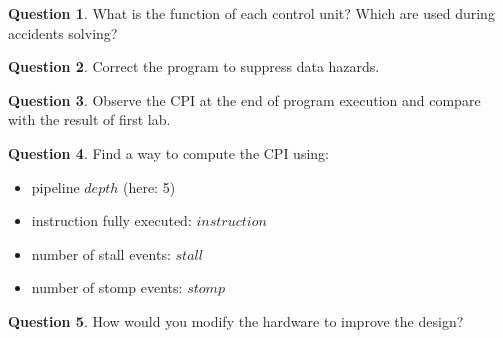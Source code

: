 \documentclass[10pt,a4paper]{article}
\theoremstyle{definition}%
\newtheorem{Q}{Question}[] %
\begin{document}
\begin{Q}
What is the function of each control unit? Which are used during accidents solving?
\end{Q}

\begin{Q}
\label{Q:X}
Correct the program to suppress data hazards.
\end{Q}


\begin{Q}
Observe the CPI at the end of program execution and compare with the result of first lab.
\end{Q}

\begin{Q}
Find a way to compute the CPI using:
\begin{itemize}
\item pipeline ${depth}$ (here: 5)
\item instruction fully executed: ${instruction}$
\item number of stall events: ${stall}$
\item number of stomp events: ${stomp}$
\end{itemize}
\end{Q}

\begin{Q}
How would you modify the hardware to improve the design?
\end{Q}
\end{document}
